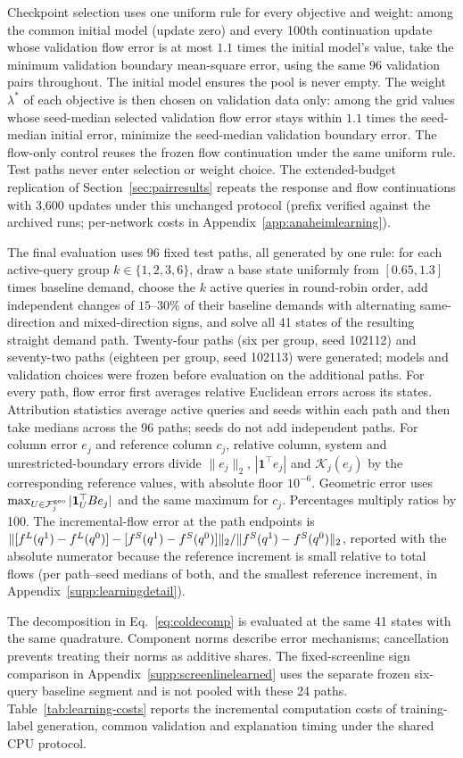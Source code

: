 Checkpoint selection uses one uniform rule for every objective and
weight: among the common initial model (update zero) and every 100th
continuation update whose validation flow error is at most $1.1$ times
the initial model's value, take the minimum validation boundary
mean-square error, using the same 96 validation pairs throughout. The
initial model ensures the pool is never empty. The weight $\lambda^*$ of
each objective is then chosen on validation data only: among the grid
values whose seed-median selected validation flow error stays within
$1.1$ times the seed-median initial error, minimize the seed-median
validation boundary error. The flow-only control reuses the frozen
flow continuation under the same uniform rule. Test paths never enter
selection or weight choice. The extended-budget replication of
Section~\ref{sec:pairresults} repeats the response and flow
continuations with 3{,}600 updates under this unchanged protocol
(prefix verified against the archived runs; per-network costs in
Appendix~\ref{app:anaheimlearning}).

The final evaluation uses 96 fixed test paths, all generated by one
rule: for each active-query group $k\in\{1,2,3,6\}$, draw a base state
uniformly from $[0.65,1.3]$ times baseline demand, choose the $k$
active queries in round-robin order, add independent changes of
$15$--$30\%$ of their baseline demands with alternating same-direction
and mixed-direction signs, and solve all 41 states of the resulting
straight demand path. Twenty-four paths (six per group, seed 102112)
and seventy-two paths (eighteen per group, seed 102113) were generated;
models and validation choices were frozen before evaluation on the
additional paths. For every path, flow error first averages relative
Euclidean errors across its states. Attribution statistics average active
queries and seeds within each path and then take medians across the 96 paths;
seeds do not add independent paths. For column error $e_j$ and reference column
$c_j$, relative column, system and unrestricted-boundary errors divide
$\|e_j\|_2$, $|\mathbf1^\top e_j|$ and $\mathcal K_j(e_j)$ by the
corresponding reference values, with absolute floor $10^{-6}$. Geometric error
uses $\max_{U\in\mathcal F_j^{\rm geo}}|\mathbf1_U^\top Be_j|$ and
the same maximum for $c_j$. Percentages multiply ratios by 100. The
incremental-flow error at the path endpoints is
$\lVert [f^L(q^1)-f^L(q^0)]-[f^S(q^1)-f^S(q^0)] \rVert_2/\lVert f^S(q^1)-f^S(q^0) \rVert_2$,
reported with the absolute numerator because the reference increment
is small relative to total flows (per path--seed medians of both, and
the smallest reference increment, in
Appendix~\ref{supp:learningdetail}).

The decomposition in Eq.~\eqref{eq:coldecomp} is evaluated at the same 41 states
with the same quadrature. Component norms describe error mechanisms; cancellation
prevents treating their norms as additive shares. The fixed-screenline sign
comparison in Appendix~\ref{supp:screenlinelearned} uses the separate frozen
six-query baseline segment and is not pooled with these 24 paths.
Table~\ref{tab:learning-costs} reports the incremental computation
costs of training-label generation, common validation and explanation
timing under the shared CPU protocol.


